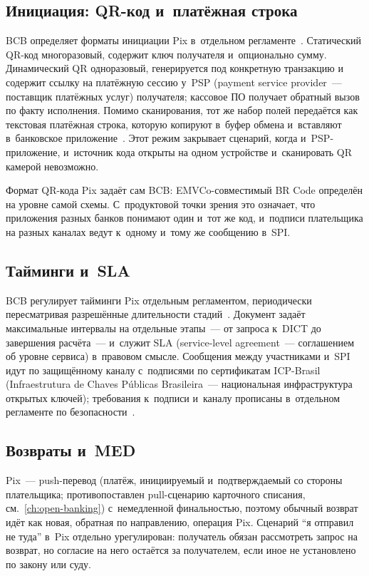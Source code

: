 \subsection*{Инициация: QR-код и~платёжная строка}\label{subsec:pix-init}

BCB определяет форматы инициации Pix в~отдельном
регламенте~\cite{pix-manual-iniciacao}. Статический QR-код многоразовый,
содержит ключ получателя и~опционально сумму. Динамический QR
одноразовый, генерируется под конкретную транзакцию и содержит ссылку
на платёжную сессию у~PSP (payment service provider~--- поставщик
платёжных услуг) получателя; кассовое ПО получает
обратный вызов по факту исполнения. Помимо сканирования, тот же набор
полей передаётся как текстовая платёжная строка, которую копируют
в~буфер обмена и~вставляют в~банковское приложение~\cite{pix-faq}.
Этот режим закрывает сценарий, когда и~PSP-приложение, и~источник
кода открыты на одном устройстве и~сканировать QR камерой невозможно.

Формат QR-кода Pix задаёт сам BCB: EMVCo-совместимый BR Code определён
на уровне самой схемы. С~продуктовой точки зрения это означает, что
приложения разных банков понимают один и~тот же код, и~подписи плательщика
на разных каналах ведут к~одному и~тому же сообщению в~SPI.

\subsection*{Тайминги и~SLA}\label{subsec:pix-timings}

BCB регулирует тайминги Pix отдельным регламентом, периодически
пересматривая разрешённые длительности стадий~\cite{pix-manual-tempos}.
Документ задаёт максимальные интервалы на отдельные этапы~--- от запроса
к~DICT до завершения расчёта~--- и~служит SLA (service-level agreement~---
соглашением об уровне сервиса) в~правовом смысле.
Сообщения между участниками и~SPI идут по защищённому каналу с~подписями
по сертификатам ICP-Brasil (Infraestrutura de Chaves Públicas Brasileira~---
национальная инфраструктура открытых ключей); требования к~подписи и~каналу прописаны
в~отдельном регламенте по безопасности~\cite{pix-manual-seguranca}.

\subsection*{Возвраты и~MED}\label{subsec:pix-med}

Pix~--- push-перевод (платёж, инициируемый и~подтверждаемый со стороны
плательщика; противопоставлен pull-сценарию карточного списания,
см.~\ref{ch:open-banking}) с~немедленной финальностью, поэтому обычный
возврат идёт как новая, обратная по направлению, операция Pix. Сценарий
\enquote{я отправил не туда} в~Pix отдельно урегулирован: получатель
обязан рассмотреть запрос на возврат, но согласие на него остаётся
за получателем, если иное не установлено по закону или суду.

